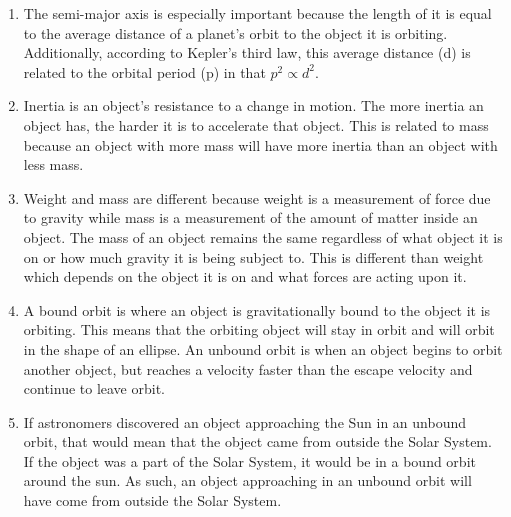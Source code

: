 \documentclass[../hw1.tex]{subfiles}
\begin{document}
    \begin{enumerate}
        \item The semi-major axis is especially important because the length of it is equal to the average distance of a planet’s orbit to the object it is orbiting. Additionally, according to Kepler’s third law, this average distance (d) is related to the orbital period (p) in that $p^2\propto d^2$.
        \item Inertia is an object’s resistance to a change in motion. The more inertia an object has, the harder it is to accelerate that object. This is related to mass because an object with more mass will have more inertia than an object with less mass.
        \item Weight and mass are different because weight is a measurement of force due to gravity while mass is a measurement of the amount of matter inside an object. The mass of an object remains the same regardless of what object it is on or how much gravity it is being subject to. This is different than weight which depends on the object it is on and what forces are acting upon it.
        \item A bound orbit is where an object is gravitationally bound to the object it is orbiting. This means that the orbiting object will stay in orbit and will orbit in the shape of an ellipse. An unbound orbit is when an object begins to orbit another object, but reaches a velocity faster than the escape velocity and continue to leave orbit.
        \item If astronomers discovered an object approaching the Sun in an unbound orbit, that would mean that the object came from outside the Solar System. If the object was a part of the Solar System, it would be in a bound orbit around the sun. As such, an object approaching in an unbound orbit will have come from outside the Solar System.
    \end{enumerate}
\end{document}
